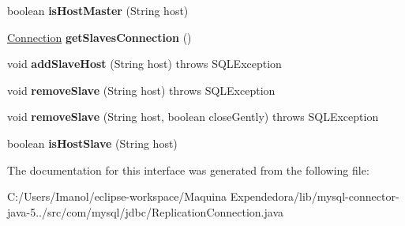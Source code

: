 \begin{DoxyCompactItemize}
boolean {\bfseries is\+Host\+Master} (String host)
\item 
\mbox{\label{interfacecom_1_1mysql_1_1jdbc_1_1_replication_connection_a3d5eca9f4948913c195df0b6844b4ea9}} 
\mbox{\hyperlink{interfacecom_1_1mysql_1_1jdbc_1_1_connection}{Connection}} {\bfseries get\+Slaves\+Connection} ()
\item 
\mbox{\label{interfacecom_1_1mysql_1_1jdbc_1_1_replication_connection_a5e45a697f5acd01434d3bba0f25cb592}} 
void {\bfseries add\+Slave\+Host} (String host)  throws S\+Q\+L\+Exception
\item 
\mbox{\label{interfacecom_1_1mysql_1_1jdbc_1_1_replication_connection_ab3d561fff1066ab5f6fc84bacb4db5df}} 
void {\bfseries remove\+Slave} (String host)  throws S\+Q\+L\+Exception
\item 
\mbox{\label{interfacecom_1_1mysql_1_1jdbc_1_1_replication_connection_aab4f0231968decf178bab248e9b84ecb}} 
void {\bfseries remove\+Slave} (String host, boolean close\+Gently)  throws S\+Q\+L\+Exception
\item 
\mbox{\label{interfacecom_1_1mysql_1_1jdbc_1_1_replication_connection_a6a0c77450b090ec070b22b00b7e8759e}} 
boolean {\bfseries is\+Host\+Slave} (String host)
\end{DoxyCompactItemize}


The documentation for this interface was generated from the following file\+:\begin{DoxyCompactItemize}
\item 
C\+:/\+Users/\+Imanol/eclipse-\/workspace/\+Maquina Expendedora/lib/mysql-\/connector-\/java-\/5../src/com/mysql/jdbc/Replication\+Connection.\+java\end{DoxyCompactItemize}
